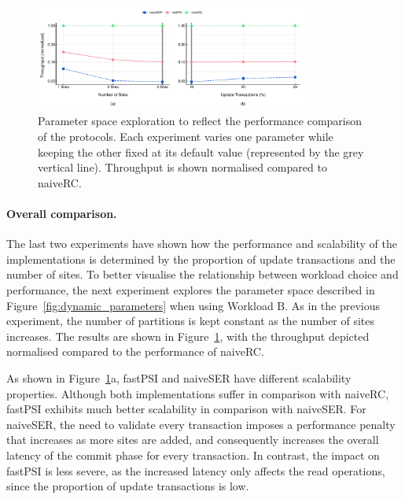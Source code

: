 \begin{figure}[t]
\begin{center}
\includegraphics[width=0.8\textwidth]{figures/dynamic_bench.pdf}
\vspace{-0.75cm}
\end{center}
\caption{Parameter space exploration to reflect the performance comparison of the protocols. Each experiment varies one parameter while keeping the other fixed at its default value (represented by the grey vertical line). Throughput is shown normalised compared to naiveRC.}
\label{fig:dynamic_bench}
\end{figure}

\paragraph{Overall comparison.} The last two experiments have shown how the performance and scalability of the implementations is determined by the proportion of update transactions and the number of sites. To better visualise the relationship between workload choice and performance, the next experiment explores the parameter space described in Figure~\ref{fig:dynamic_parameters} when using Workload B. As in the previous experiment, the number of partitions is kept constant as the number of sites increases. The results are shown in Figure~\ref{fig:dynamic_bench}, with the throughput depicted normalised compared to the performance of naiveRC.

As shown in Figure~\ref{fig:dynamic_bench}a, fastPSI and naiveSER have different scalability properties. Although both implementations suffer in comparison with naiveRC, fastPSI exhibits much better scalability in comparison with naiveSER. For naiveSER, the need to validate every transaction imposes a performance penalty that increases as more sites are added, and consequently increases the overall latency of the commit phase for every transaction. In contrast, the impact on fastPSI is less severe, as the increased latency only affects the read operations, since the proportion of update transactions is low.

